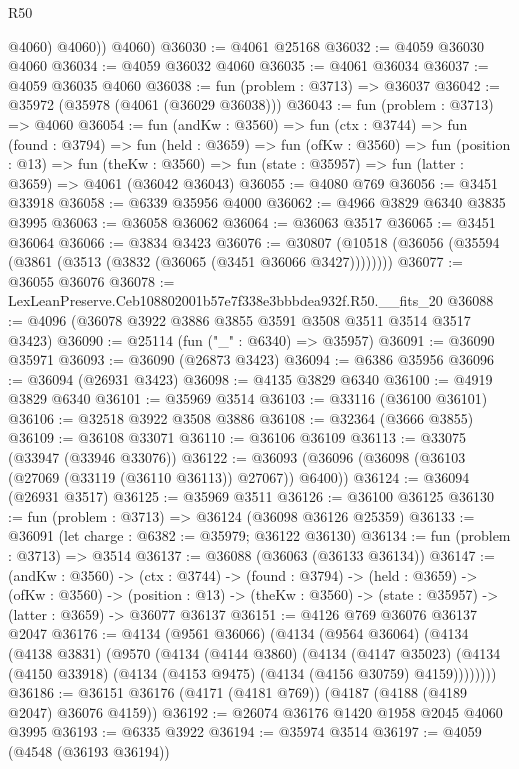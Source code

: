 \begin{lexlean}{R50}
\begin{coremodule}
            @4060)
          @4060))
      @4060)
@36030 := @4061 @25168
@36032 := @4059 @36030 @4060
@36034 := @4059 @36032 @4060
@36035 := @4061 @36034
@36037 := @4059 @36035 @4060
@36038 := fun (problem : @3713) => @36037
@36042 := @35972 (@35978 (@4061 (@36029 @36038)))
@36043 := fun (problem : @3713) => @4060
@36054 := fun (andKw : @3560) =>
  fun (ctx : @3744) =>
  fun (found : @3794) =>
  fun (held : @3659) =>
  fun (ofKw : @3560) =>
  fun (position : @13) =>
  fun (theKw : @3560) => fun (state : @35957) => fun (latter : @3659) => @4061 (@36042 @36043)
@36055 := @4080 @769
@36056 := @3451 @33918
@36058 := @6339 @35956 @4000
@36062 := @4966 @3829 @6340 @3835 @3995
@36063 := @36058 @36062
@36064 := @36063 @3517
@36065 := @3451 @36064
@36066 := @3834 @3423
@36076 := @30807 (@10518 (@36056 (@35594 (@3861 (@3513 (@3832 (@36065 (@3451 @36066 @3427))))))))
@36077 := @36055 @36076
@36078 := LexLeanPreserve.Ceb108802001b57e7f338e3bbbdea932f.R50.__fits_20
@36088 := @4096 (@36078 @3922 @3886 @3855 @3591 @3508 @3511 @3514 @3517 @3423)
@36090 := @25114 (fun ("_" : @6340) => @35957)
@36091 := @36090 @35971
@36093 := @36090 (@26873 @3423)
@36094 := @6386 @35956
@36096 := @36094 (@26931 @3423)
@36098 := @4135 @3829 @6340
@36100 := @4919 @3829 @6340
@36101 := @35969 @3514
@36103 := @33116 (@36100 @36101)
@36106 := @32518 @3922 @3508 @3886
@36108 := @32364 (@3666 @3855)
@36109 := @36108 @33071
@36110 := @36106 @36109
@36113 := @33075 (@33947 (@33946 @33076))
@36122 := @36093 (@36096 (@36098 (@36103 (@27069 (@33119 (@36110 @36113)) @27067)) @6400))
@36124 := @36094 (@26931 @3517)
@36125 := @35969 @3511
@36126 := @36100 @36125
@36130 := fun (problem : @3713) => @36124 (@36098 @36126 @25359)
@36133 := @36091 (let charge : @6382 := @35979; @36122 @36130)
@36134 := fun (problem : @3713) => @3514
@36137 := @36088 (@36063 (@36133 @36134))
@36147 := (andKw : @3560) ->
  (ctx : @3744) ->
  (found : @3794) ->
  (held : @3659) ->
  (ofKw : @3560) ->
  (position : @13) -> (theKw : @3560) -> (state : @35957) -> (latter : @3659) -> @36077 @36137
@36151 := @4126 @769 @36076 @36137 @2047
@36176 := @4134
    (@9561 @36066)
    (@4134
      (@9564 @36064)
      (@4134
        (@4138 @3831)
        (@9570
          (@4134
            (@4144 @3860)
            (@4134
              (@4147 @35023)
              (@4134 (@4150 @33918) (@4134 (@4153 @9475) (@4134 (@4156 @30759) @4159))))))))
@36186 := @36151 @36176 (@4171 (@4181 @769)) (@4187 (@4188 (@4189 @2047) @36076 @4159))
@36192 := @26074 @36176 @1420 @1958 @2045 @4060 @3995
@36193 := @6335 @3922
@36194 := @35974 @3514
@36197 := @4059 (@4548 (@36193 @36194))

\end{coremodule}
\end{lexlean}
